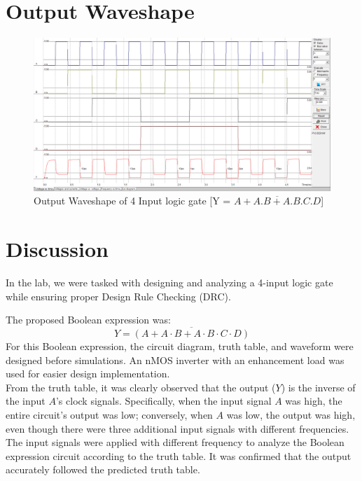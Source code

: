 \documentclass[a4paper,12pt]{article}
\begin{document}
	\section{Output Waveshape }
		\begin{figure}[H]
		\centering
	\includegraphics[width=1\linewidth, height=.45\textheight]{Images/2}
		\caption{Output Waveshape of 4 Input logic gate [Y = $\overline{A + A . B + A . B . C . D}$]}
		\label{fig:open}
	\end{figure}
	\section{Discussion }
	In the lab, we were tasked with designing and analyzing a 4-input logic gate while ensuring proper Design Rule Checking (DRC). 
	
	The proposed Boolean expression was:  
	\[
	Y = \overline{(A + A \cdot B + A \cdot B \cdot C \cdot D)} 
	\]
	For this Boolean expression, the circuit diagram, truth table, and waveform were designed before simulations. An nMOS inverter with an enhancement load was used for easier design implementation. \\	From the truth table, it was clearly observed that the output (\(Y\)) is the inverse of the input \(A\)'s clock signals. Specifically, when the input signal \(A\) was high, the entire circuit's output was low; conversely, when \(A\) was low, the output was high, even though there were three additional input signals with different frequencies.	The input signals were applied with different frequency to analyze the Boolean expression circuit according to the truth table. It was confirmed that the output accurately followed the predicted truth table.
	
\end{document}
